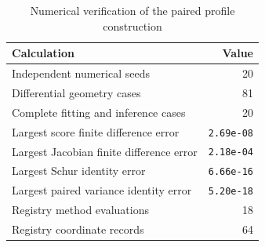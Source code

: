 \begin{table}[t]
\caption{Numerical verification of the paired profile construction}\label{tab:pair-verification}
\begin{tabularx}{\textwidth}{@{}Xr@{}}
\toprule
Calculation & Value \\
\midrule
Independent numerical seeds & 20 \\
Differential geometry cases & 81 \\
Complete fitting and inference cases & 20 \\
Largest score finite difference error & \texttt{2.69e-08} \\
Largest Jacobian finite difference error & \texttt{2.18e-04} \\
Largest Schur identity error & \texttt{6.66e-16} \\
Largest paired variance identity error & \texttt{5.20e-18} \\
Registry method evaluations & 18 \\
Registry coordinate records & 64 \\
\bottomrule
\end{tabularx}
\end{table}
